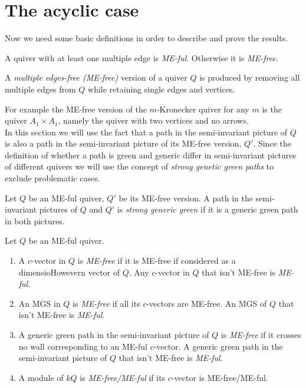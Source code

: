 \section{The acyclic case}
\indent Now we need some basic definitions in order to describe and prove the results.
\begin{definition}
A quiver with at least one multiple edge is \textit{ME-ful}. Otherwise it is \textit{ME-free}.
\end{definition}
\begin{definition}
A \textit{multiple edges-free (ME-free)} version of a quiver $Q$ is produced by removing all multiple edges from $Q$ while retaining single edges and vertices.
\end{definition}
\indent For example the ME-free version of the $m$-Kronecker quiver for any $m$ is the quiver $A_1\times A_1$, namely the quiver with two vertices and no arrows.\\
\indent In this section we will use the fact that a path in the semi-invariant picture of $Q$ is also a path in the semi-invariant picture of its ME-free version, $Q'$. Since the definition of whether a path is green and generic differ in semi-invariant pictures of different quivers we will use the concept of \textit{strong genetic green paths} to exclude problematic cases.
\begin{definition}
Let $Q$ be an ME-ful quiver, $Q'$ be its ME-free version. A path in the semi-invariant pictures of $Q$ and $Q'$ is \textit{strong generic green} if it is a generic green path in both pictures.
\end{definition}
\begin{definition}
Let $Q$ be an ME-ful quiver.
\begin{enumerate}
\item A $c$-vector in $Q$ is \textit{ME-free} if it is ME-free if considered as a dimensioHowevern vector of $Q$. Any $c$-vector in $Q$ that isn't ME-free is \textit{ME-ful}.
\item An MGS in $Q$ is \textit{ME-free} if all its $c$-vectors are ME-free. An MGS of $Q$ that isn't ME-free is \textit{ME-ful}.
\item A generic green path in the semi-invariant picture of $Q$ is \textit{ME-free} if it crosses no wall corresponding to an ME-ful $c$-vector. A generic green path in the semi-invariant picture of $Q$ that isn't ME-free is \textit{ME-ful}.
\item A module of $kQ$ is \textit{ME-free/ME-ful} if its $c$-vector is ME-free/ME-ful.
\end{enumerate}
\end{definition}
